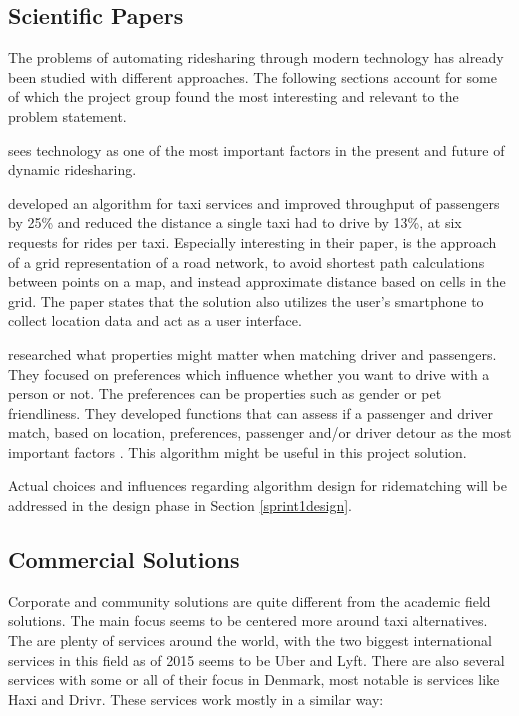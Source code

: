 \subsection{Scientific Papers}
The problems of automating ridesharing through modern technology has already been studied with different approaches.
The following sections account for some of which the project group found the most interesting and relevant to the problem statement. 

\citet{doi:10.1080/01441647.2011.621557, amey2011real} sees technology as one of the most important factors in the present and future of dynamic ridesharing.

\citet{ShuoMa2013} developed an algorithm for taxi services and improved throughput of passengers by 25\% and reduced the distance a single taxi had to drive by 13\%, at six requests for rides per taxi. %
Especially interesting in their paper, is the approach of a grid representation of a road network, to avoid shortest path calculations between points on a map, and instead approximate distance based on cells in the grid.
The paper states that the solution also utilizes the user's smartphone to collect location data and act as a user interface.

\citet{ghoseiri2011real} researched what properties might matter when matching driver and passengers.
They focused on preferences which influence whether you want to drive with a person or not. The preferences can be properties such as gender or pet friendliness.
They developed functions that can assess if a passenger and driver match, based on location, preferences, passenger and/or driver detour as the most important factors \cite{ghoseiri2011real}.
This algorithm might be useful in this project solution.

Actual choices and influences regarding algorithm design for ridematching will be addressed in the design phase in Section \ref{sprint1design}.

\subsection{Commercial Solutions}
Corporate and community solutions are quite different from the academic field solutions.
The main focus seems to be centered more around taxi alternatives.
The are plenty of services around the world, with the two biggest international services in this field as of 2015 seems to be Uber and Lyft\cite{ridehail}.
There are also several services with some or all of their focus in Denmark, most notable is services like Haxi and Drivr.
These services work mostly in a similar way: 

